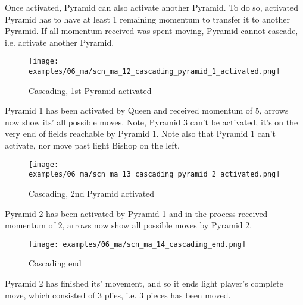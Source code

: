 Once activated, Pyramid can also activate another Pyramid. To do so, activated
Pyramid has to have at least 1 remaining momentum to transfer it to another
Pyramid. If all momentum received was spent moving, Pyramid cannot cascade, i.e.
activate another Pyramid.

\clearpage %

\noindent
\begin{figure}[!h]
\texttt{[image: examples/06\_ma/scn\_ma\_12\_cascading\_pyramid\_1\_activated.png]}
\caption{Cascading, 1st Pyramid activated}
\label{fig:scn_ma_12_cascading_pyramid_1_activated}
\end{figure}

Pyramid 1 has been activated by Queen and received momentum of 5, arrows now show
its' all possible moves. Note, Pyramid 3 can't be activated, it's on the very end
of fields reachable by Pyramid 1. Note also that Pyramid 1 can't activate, nor move
past light Bishop on the left.

\clearpage %

\noindent
\begin{figure}[!h]
\texttt{[image: examples/06\_ma/scn\_ma\_13\_cascading\_pyramid\_2\_activated.png]}
\caption{Cascading, 2nd Pyramid activated}
\label{fig:scn_ma_13_cascading_pyramid_2_activated}
\end{figure}

Pyramid 2 has been activated by Pyramid 1 and in the process received momentum of 2,
arrows now show all possible moves by Pyramid 2.

\clearpage %

\noindent
\begin{figure}[!h]
\texttt{[image: examples/06\_ma/scn\_ma\_14\_cascading\_end.png]}
\caption{Cascading end}
\label{fig:scn_ma_14_cascading_end}
\end{figure}

Pyramid 2 has finished its' movement, and so it ends light player's complete move,
which consisted of 3 plies, i.e. 3 pieces has been moved.

